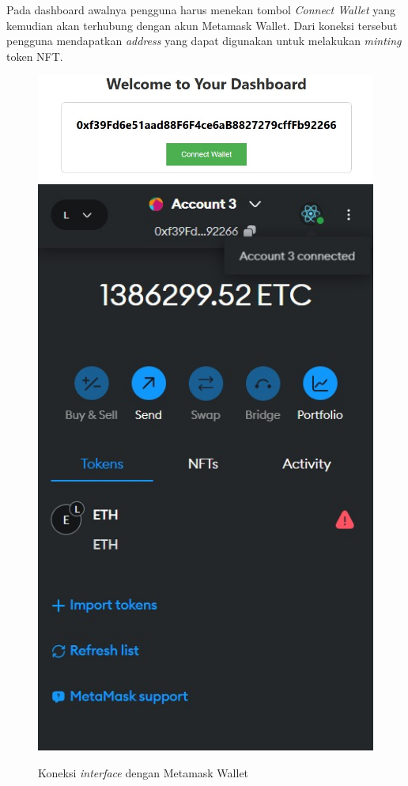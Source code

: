 Pada dashboard awalnya pengguna harus menekan tombol \emph{Connect Wallet} yang kemudian akan terhubung dengan akun Metamask Wallet. Dari koneksi tersebut pengguna mendapatkan \emph{address} yang dapat digunakan untuk melakukan \emph{minting} token NFT.

\begin{figure} [H] \centering
  \includegraphics[scale=0.45]{gambar/dashboard_connected.jpeg}
  \includegraphics[scale=0.35]{gambar/metamask_connected.jpeg}
  \caption{Koneksi \emph{interface} dengan Metamask Wallet}
  \label{fig:koneksi_metamask}
\end{figure}

